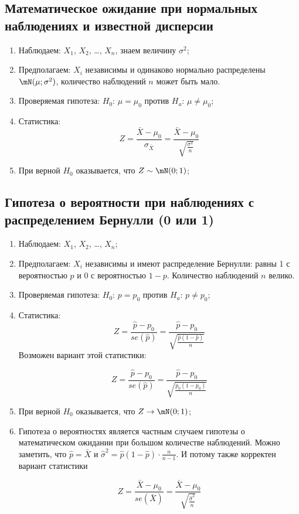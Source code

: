 \documentclass[12pt, a4paper, oneside]{article}
\begin{document}
\subsection*{Математическое ожидание при нормальных наблюдениях и известной дисперсии}

\begin{enumerate}
    \item Наблюдаем: $X_1$, $X_2$, \ldots, $X_n$, знаем величину $\sigma^2$;
    
    \item Предполагаем: $X_i$ независимы и одинаково нормально распределены $\mN(\mu; \sigma^2)$, количество наблюдений $n$ может быть мало.
    
    \item Проверяемая гипотеза: $H_0$: $\mu = \mu_0$ против $H_a$: $\mu \neq \mu_0$;
    
    \item Статистика:
    \[
    Z = \frac{\bar X - \mu_0}{\sigma_{\bar X}} = \frac{\bar X - \mu_0}{\sqrt{\frac{\sigma^2}{n}}}
    \]
    
    \item При верной $H_0$ оказывается, что $Z \sim \mN(0;1)$;
\end{enumerate}

\subsection*{Гипотеза о вероятности при наблюдениях с распределением Бернулли (0 или 1)}

\begin{enumerate}
    \item Наблюдаем: $X_1$, $X_2$, \ldots, $X_n$;
    
    \item Предполагаем: $X_i$ независимы и имеют распределение Бернулли: равны 1 с вероятностью $p$ и 0 с вероятностью $1-p$. Количество наблюдений $n$ велико.
    
    \item Проверяемая гипотеза: $H_0$: $p = p_0$ против $H_a$: $p \neq p_0$;
    
    \item Статистика:
    \[
    Z = \frac{\hat p - p_0}{se(\hat p)} = \frac{\hat p - p_0}{\sqrt{\frac{\hat p (1- \hat p)}{n}}}
    \]
    Возможен вариант этой статистики:
    
    \[
    Z = \frac{\hat p - p_0}{se(\hat p)} = \frac{\hat p - p_0}{\sqrt{\frac{p_0 (1- p_0 )}{n}}}
    \]
    
    \item При верной $H_0$ оказывается, что $Z \to \mN(0;1)$;
    
    \item Гипотеза о вероятностях является частным случаем гипотезы о математическом ожидании при большом количестве наблюдений. Можно заметить, что $\hat p = \bar X$ и $\hat \sigma^2 = \hat p (1- \hat p) \cdot \frac{n}{n-1}$. И потому также корректен вариант статистики
    
    \[
    Z = \frac{\bar X - \mu_0}{se(\bar X)} = \frac{\bar X - \mu_0}{\sqrt{\frac{\hat \sigma^2}{n}}}
    \]
\end{enumerate}
  
\end{document}
